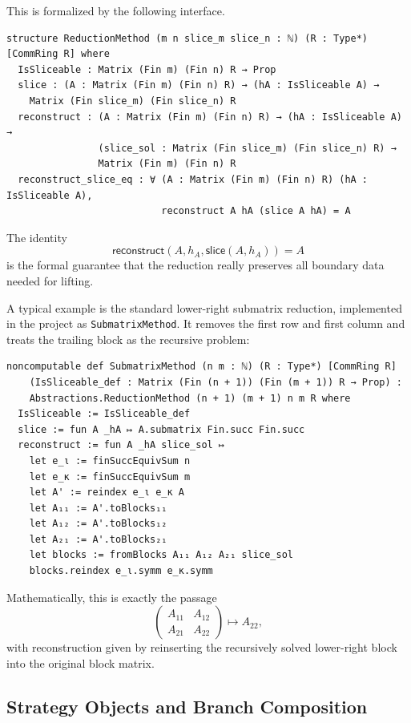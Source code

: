 \documentclass[pdflatex,sn-mathphys-num]{sn-jnl}%
\theoremstyle{thmstyleone}%
\theoremstyle{thmstyletwo}%
\theoremstyle{thmstylethree}%
\begin{document}
This is formalized by the following interface.

\begin{lstlisting}
structure ReductionMethod (m n slice_m slice_n : ℕ) (R : Type*) [CommRing R] where
  IsSliceable : Matrix (Fin m) (Fin n) R → Prop
  slice : (A : Matrix (Fin m) (Fin n) R) → (hA : IsSliceable A) →
    Matrix (Fin slice_m) (Fin slice_n) R
  reconstruct : (A : Matrix (Fin m) (Fin n) R) → (hA : IsSliceable A) →
                (slice_sol : Matrix (Fin slice_m) (Fin slice_n) R) →
                Matrix (Fin m) (Fin n) R
  reconstruct_slice_eq : ∀ (A : Matrix (Fin m) (Fin n) R) (hA : IsSliceable A),
                           reconstruct A hA (slice A hA) = A
\end{lstlisting}

The identity
\[
\mathsf{reconstruct}(A,h_A,\mathsf{slice}(A,h_A)) = A
\]
is the formal guarantee that the reduction really preserves all boundary data needed for lifting.

A typical example is the standard lower-right submatrix reduction, implemented in the project as \texttt{SubmatrixMethod}.  It removes the first row and first column and treats the trailing block as the recursive problem:

\begin{lstlisting}
noncomputable def SubmatrixMethod (n m : ℕ) (R : Type*) [CommRing R]
    (IsSliceable_def : Matrix (Fin (n + 1)) (Fin (m + 1)) R → Prop) :
    Abstractions.ReductionMethod (n + 1) (m + 1) n m R where
  IsSliceable := IsSliceable_def
  slice := fun A _hA ↦ A.submatrix Fin.succ Fin.succ
  reconstruct := fun A _hA slice_sol ↦
    let e_ι := finSuccEquivSum n
    let e_κ := finSuccEquivSum m
    let A' := reindex e_ι e_κ A
    let A₁₁ := A'.toBlocks₁₁
    let A₁₂ := A'.toBlocks₁₂
    let A₂₁ := A'.toBlocks₂₁
    let blocks := fromBlocks A₁₁ A₁₂ A₂₁ slice_sol
    blocks.reindex e_ι.symm e_κ.symm
\end{lstlisting}

Mathematically, this is exactly the passage
\[
\begin{pmatrix}
A_{11} & A_{12}\\
A_{21} & A_{22}
\end{pmatrix}
\longmapsto
A_{22},
\]
with reconstruction given by reinserting the recursively solved lower-right block into the original block matrix.

\subsection{Strategy Objects and Branch Composition}
\end{document}
